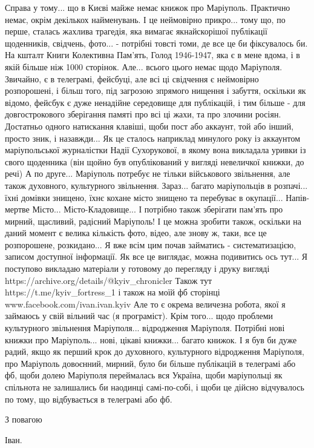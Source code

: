 Справа у тому... що в Києві майже немає книжок про Маріуполь.
Практично немає, окрім декількох найменувань. І це неймовірно прикро... тому
що, по перше, сталась жахлива трагедія, яка вимагає якнайскорішої публікації
щоденників, свідчень, фото... - потрібні товсті томи, де все це би фіксувалось
би. На кшталт Книги Колективна Пам'ять, Голод 1946-1947, яка є в мене вдома, і
в якій більше ніж 1000 сторінок.  Але... всього цього немає щодо Маріуполя.
Звичайно, є в телеграмі, фейсбуці, але всі ці свідчення є неймовірно
розпорошені, і більш того, під загрозою зпрямого нищення і забуття, оскільки як
відомо, фейсбук є дуже ненадійне середовище для публікацій, і тим більше - для
довгострокового зберігання памяті про всі ці жахи, та про злочини росіян.
Достатньо одного натискання клавіші, щоби пост або аккаунт, той або інший,
просто зник, і назавжди... Як це сталось наприклад минулого року із аккаунтом
маріупольської журналістки Надії Сухорукової, в якому вона викладала уривки із
свого щоденника (він щойно був опублікований у вигляді невеличкої книжки, до
речі) А по друге... Маріуполь потребує не тільки військового звільнення, але
також духовного, культурного звільнення. Зараз... багато маріупольців в
розпачі... їхні домівки знищено, їхнє кохане місто знищено та перебуває в
окупації... Напів-мертве Місто... Місто-Кладовище... І потрібно також зберігати
пам'ять про мирний, щасливий, радісний Маріуполь! І це можна зробити також,
оскільки на даний момент є велика кількість фото, відео, але знову ж, таки, все
це розпорошене, розкидано... Я вже всім цим почав займатись - систематизацією,
записом доступної інформації. Як все це виглядає, можна подивитись ось тут... Я
поступово викладаю матеріали у готовому до перегляду і друку вигляді
https://archive.org/details/@kyiv_chronicler  Також тут
https://t.me/kyiv_fortress_1 і також на моїй фб сторінці www.facebook.com/ivan.ivan.kyiv Але то є окрема
величезна робота, якої я займаюсь у свій вільний час (я програміст). Крім
того... щодо проблеми культурного звільнення Маріуполя... відродження
Маріуполя. Потрібні нові книжки про Маріуполь... нові, цікаві книжки... багато
книжок. І я був би дуже радий, якщо як перший крок до духовного, культурного відродження Маріуполя,
про Маріуполь довоєнний, мирний, було би більше публікацій в телеграмі або фб,
щоби долею Маріуполя переймалась вся Україна, щоби маріупольці як спільнота не залишались би наодинці самі-по-собі,
і щоби це дійсно відчувалось по тому, що відбувається
в телеграмі або фб.

З повагою

Іван.


